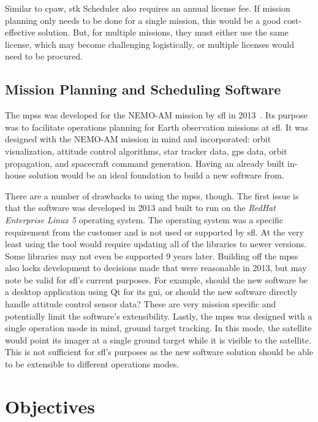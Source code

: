 Similar to \gls{cpaw}, \gls{stk} Scheduler also requires an annual license fee.
If mission planning only needs to be done for a single mission, this would be a
good cost-effective solution. But, for multiple missions, they must either use
the same license, which may become challenging logistically, or multiple
licenses would need to be procured.


\subsection{Mission Planning and Scheduling Software}

The \gls{mpss} was developed for the NEMO-AM mission by \gls{sfl} in
2013~\cite{mehradnia_design_2013}.  Its purpose was to facilitate operations
planning for Earth observation missions at \gls{sfl}. It was designed with the
NEMO-AM mission in mind and incorporated: orbit visualization, attitude control
algorithms, star tracker data, \gls{gps} data, orbit propagation, and
spacecraft command generation.  Having an already built in-house solution would
be an ideal foundation to build a new software from. 

There are a number of drawbacks to using the \gls{mpss}, though. The first
issue is that the software was developed in 2013 and built to run on the
\textit{RedHat Enterprise Linux 5} operating system. The operating system was a
specific requirement from the customer and is not used or supported by
\gls{sfl}. At the very least using the tool would require updating all of the
libraries to newer versions. Some libraries may not even be supported 9 years
later. Building off the \gls{mpss} also locks development to decisions made
that were reasonable in 2013, but may note be valid for \gls{sfl}'s current
purposes.  For example, should the new software be a desktop application using
Qt for its \gls{gui}, or should the new software directly handle attitude
control sensor data? These are very mission specific and potentially limit the
software's extensibility. Lastly, the \gls{mpss} was designed with a single
operation mode in mind, ground target tracking. In this mode, the satellite
would point its imager at a single ground target while it is visible to the
satellite. This is not sufficient for \gls{sfl}'s purposes as the new software
solution should be able to be extensible to different operations modes.    


\section{Objectives}

